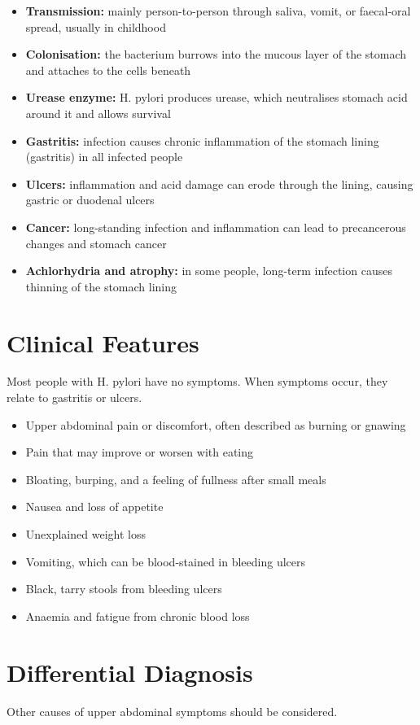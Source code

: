 \begin{itemize}
    \item \textbf{Transmission:} mainly person-to-person through saliva, vomit, or faecal-oral spread, usually in childhood
    \item \textbf{Colonisation:} the bacterium burrows into the mucous layer of the stomach and attaches to the cells beneath
    \item \textbf{Urease enzyme:} H. pylori produces urease, which neutralises stomach acid around it and allows survival
    \item \textbf{Gastritis:} infection causes chronic inflammation of the stomach lining (gastritis) in all infected people
    \item \textbf{Ulcers:} inflammation and acid damage can erode through the lining, causing gastric or duodenal ulcers
    \item \textbf{Cancer:} long-standing infection and inflammation can lead to precancerous changes and stomach cancer
    \item \textbf{Achlorhydria and atrophy:} in some people, long-term infection causes thinning of the stomach lining
\end{itemize}

\section*{Clinical Features}
Most people with H. pylori have no symptoms. When symptoms occur, they relate to gastritis or ulcers.

\begin{itemize}
    \item Upper abdominal pain or discomfort, often described as burning or gnawing
    \item Pain that may improve or worsen with eating
    \item Bloating, burping, and a feeling of fullness after small meals
    \item Nausea and loss of appetite
    \item Unexplained weight loss
    \item Vomiting, which can be blood-stained in bleeding ulcers
    \item Black, tarry stools from bleeding ulcers
    \item Anaemia and fatigue from chronic blood loss
\end{itemize}

\section*{Differential Diagnosis}
Other causes of upper abdominal symptoms should be considered.

